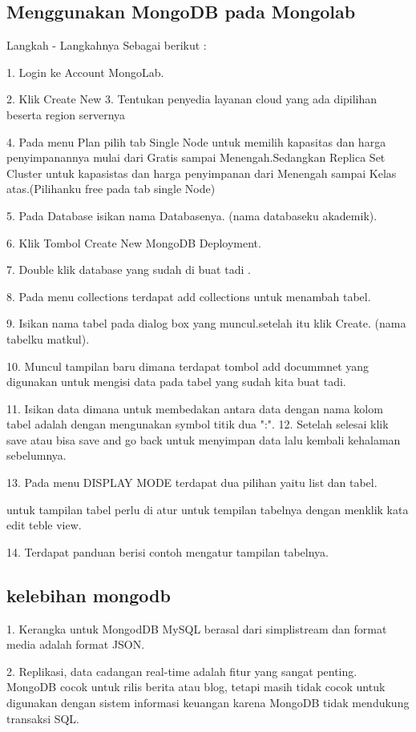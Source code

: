 \subsection {Menggunakan MongoDB pada Mongolab}
Langkah - Langkahnya Sebagai berikut :

1. Login ke Account MongoLab.

2. Klik Create New
3. Tentukan penyedia layanan cloud yang ada dipilihan beserta region servernya

4. Pada menu Plan pilih tab Single Node untuk memilih kapasitas dan harga penyimpanannya mulai dari Gratis sampai Menengah.Sedangkan Replica Set Cluster untuk kapasistas dan harga penyimpanan dari Menengah sampai Kelas atas.(Pilihanku free pada tab single Node)

5. Pada Database isikan nama Databasenya. (nama databaseku akademik).

6. Klik Tombol Create New MongoDB Deployment.

7. Double klik database yang sudah di buat tadi .

8. Pada menu collections terdapat add collections untuk menambah tabel.

9. Isikan nama tabel pada dialog box yang muncul.setelah itu klik Create. (nama tabelku matkul).

10. Muncul tampilan baru dimana terdapat tombol add docummnet yang digunakan untuk mengisi data pada tabel yang sudah kita buat tadi.

11. Isikan data dimana untuk membedakan antara data dengan nama kolom tabel adalah dengan mengunakan symbol titik dua ":".
12. Setelah selesai klik save atau bisa save and go back untuk menyimpan data lalu kembali kehalaman sebelumnya.

13. Pada menu DISPLAY MODE terdapat dua pilihan yaitu list dan tabel. 

untuk tampilan tabel perlu di atur untuk tempilan tabelnya dengan menklik kata edit teble view.

14. Terdapat panduan berisi contoh mengatur tampilan tabelnya.

\subsection {kelebihan mongodb}

1. Kerangka untuk MongodDB MySQL berasal dari simplistream dan format media adalah format JSON.

2. Replikasi, data cadangan real-time adalah fitur yang sangat penting. MongoDB cocok untuk rilis berita atau blog, tetapi masih tidak cocok untuk digunakan dengan sistem informasi keuangan karena MongoDB tidak mendukung transaksi SQL.

